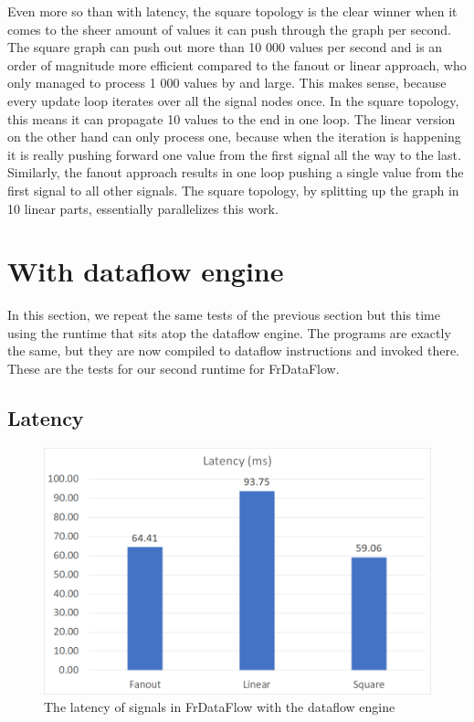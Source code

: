 Even more so than with latency, the square topology is the clear winner when it comes to the sheer amount of values it can push through the graph per second. The square graph can push out more than 10 000 values per second and is an order of magnitude more efficient compared to the fanout or linear approach, who only managed to process 1 000 values by and large. This makes sense, because every update loop iterates over all the signal nodes once. In the square topology, this means it can propagate 10 values to the end in one loop. The linear version on the other hand can only process one, because when the iteration is happening it is really pushing forward one value from the first signal all the way to the last. Similarly, the fanout approach results in one loop pushing a single value from the first signal to all other signals. The square topology, by splitting up the graph in 10 linear parts, essentially 
parallelizes this work. 

\section{With dataflow engine}

In this section, we repeat the same tests of the previous section but this time using the runtime that sits atop the dataflow engine. The programs are exactly the same, but they are now compiled to dataflow instructions and invoked there. These are the tests for our second runtime for FrDataFlow. 

\subsection{Latency}

\begin{figure}[h]
    \includegraphics[width=\textwidth]{images/Evaluation-WithDataFlow-Latency.png}
	\caption{The latency of signals in FrDataFlow with the dataflow engine}
	\label{fig:evaluation-withdataflow-latency}
\end{figure}

